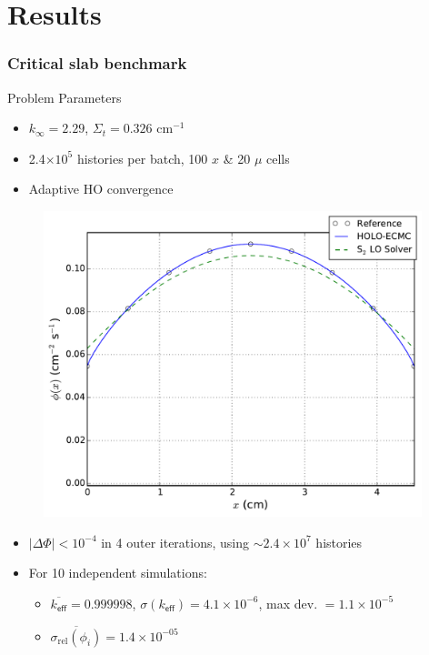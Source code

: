 \documentclass[xcolor=dvipsnames,handout]{beamer}
\newcommand{\keff}[0]{\ensuremath{{k}_{\textsf{eff}}} }
\newcommand{\coly}[1]{{\color{yellow} #1}}
\newlength{\wideitemsep}
\let\olditem\item
\renewcommand{\item}{\setlength{\itemsep}{\wideitemsep}\olditem}
\begin{document}
\section{Results}
\begin{frame}
    \frametitle{\coly{Critical slab benchmark}}
    \fontsize{9}{5.0}\selectfont
    \begin{block}{Problem Parameters}
    \begin{itemize}
        \item $k_\infty = 2.29$, $\Sigma_t = 0.326$ cm$^{-1}$
        \item 2.4$\times10^5$ histories per batch, 100 $x$ \& 20 $\mu$ cells
        \item Adaptive HO convergence
    \end{itemize}
    \end{block}
    \begin{minipage}{0.49\textwidth}
    \begin{figure}
    \centering
    \includegraphics[width=0.98\textwidth]{sood_fiss_src.pdf}
    \end{figure}
    \end{minipage}
    \begin{minipage}{0.49\textwidth}
    \begin{itemize}
        \item $|\Delta \Phi| < 10^{-4}$ in 4 outer iterations, using            $\sim2.4\times10^7$ histories
        \item For 10 independent simulations:
            \begin{itemize}
                \item  $\overline{\keff} = 0.999998$,
                    $\sigma(\keff)=4.1\times10^{-6}$, max dev. $=1.1\times10^{-5}$
                \item $\overline{\sigma_{\text{rel}}(\phi_i)} = 1.4\times10^{-05}$
            \end{itemize}
    \end{itemize}
    \end{minipage}
\end{frame}
\end{document}
